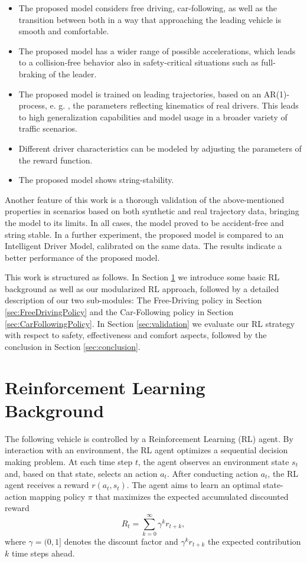 \documentclass[review]{elsarticle}
\providecommand{\3}{{\ss}}
\begin{document}
\begin{itemize}
	\item  The proposed model considers free driving, car-following, as well as the transition between both in a way that approaching the leading vehicle is smooth and comfortable.
	\item The proposed model has a wider range of possible accelerations, which leads to a collision-free behavior also in safety-critical situations such as full-braking of the leader.
	\item The proposed model is trained on leading trajectories, based on an AR(1)-process, e. g. \cite{HonerkampEngl}, the parameters reflecting kinematics of real drivers. This leads to high generalization capabilities and model usage in a broader variety of traffic scenarios. 
	\item Different driver characteristics can be modeled by adjusting the parameters of the reward function.
	\item The proposed model shows string-stability.
	
\end{itemize}

Another feature of this work is a thorough validation of the above-mentioned properties in scenarios based on both synthetic and real trajectory data, bringing the model to its limits. 
In all cases, the model proved to be accident-free and string stable.
In a further experiment, the proposed model is compared to an Intelligent Driver Model, calibrated on the same data. The results indicate a better performance of the proposed model.

This work is structured as follows. In Section \ref{sec:RLBackground} we introduce some basic RL background as well as our modularized RL approach, followed by a detailed description of our two sub-modules: The Free-Driving policy in Section \ref{sec:FreeDrivingPolicy} and the Car-Following policy in Section \ref{sec:CarFollowingPolicy}. In Section \ref{sec:validation} we evaluate our RL strategy with respect to safety, effectiveness and comfort aspects, followed by the conclusion in Section \ref{sec:conclusion}.


\section{Reinforcement Learning Background}
\label{sec:RLBackground}

The following vehicle is controlled by a Reinforcement
Learning (RL) agent. By interaction with an environment, the RL agent
optimizes a sequential decision making problem. At each time step
$t$, the agent observes an environment state $s_t$ and, based on that state, selects
an action $a_t$. After conducting action $a_t$, the RL agent receives
a reward $r(a_t,s_t)$. The agent aims to learn an optimal state-action
mapping policy $\pi$ that maximizes the expected accumulated
discounted reward
\begin{equation}
\label{Rt}
R_{t}=\sum_{k=0}^{\infty} \gamma^{k} r_{t+k},
\end{equation}
 where $\gamma = (0,1]$ denotes the discount factor and 
$\gamma^k r_{t+k}$ the expected contribution $k$ time steps ahead. 
\end{document}

